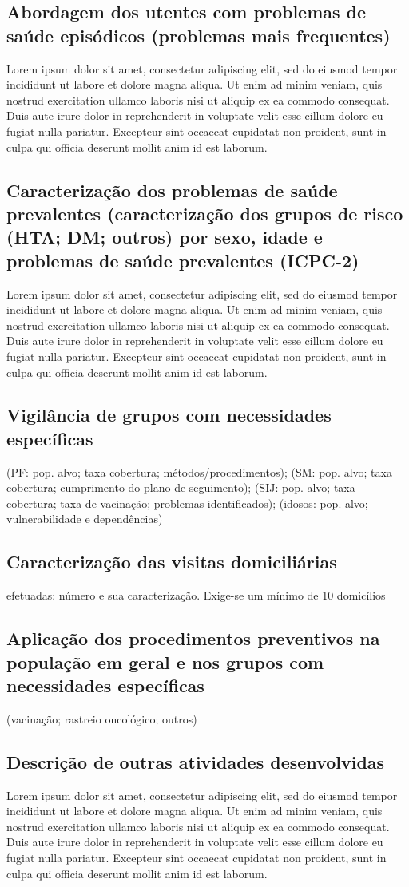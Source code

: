 \documentclass{report}
\begin{document}
\subsection{Abordagem dos utentes com problemas de saúde episódicos (problemas mais frequentes)}
Lorem ipsum dolor sit amet, consectetur adipiscing elit, sed do eiusmod tempor incididunt ut labore et dolore magna aliqua. Ut enim ad minim veniam, quis nostrud exercitation ullamco laboris nisi ut aliquip ex ea commodo consequat. Duis aute irure dolor in reprehenderit in voluptate velit esse cillum dolore eu fugiat nulla pariatur. Excepteur sint occaecat cupidatat non proident, sunt in culpa qui officia deserunt mollit anim id est laborum.
\subsection{Caracterização dos problemas de saúde prevalentes (caracterização dos grupos de risco (HTA; DM; outros) por sexo, idade e problemas de saúde prevalentes (ICPC-2)}
Lorem ipsum dolor sit amet, consectetur adipiscing elit, sed do eiusmod tempor incididunt ut labore et dolore magna aliqua. Ut enim ad minim veniam, quis nostrud exercitation ullamco laboris nisi ut aliquip ex ea commodo consequat. Duis aute irure dolor in reprehenderit in voluptate velit esse cillum dolore eu fugiat nulla pariatur. Excepteur sint occaecat cupidatat non proident, sunt in culpa qui officia deserunt mollit anim id est laborum.
\subsection{Vigilância de grupos com necessidades específicas}
(PF: pop. alvo; taxa cobertura; métodos/procedimentos); (SM: pop. alvo; taxa cobertura; cumprimento do plano de seguimento); (SIJ: pop. alvo; taxa cobertura; taxa de vacinação; problemas identificados); (idosos: pop. alvo; vulnerabilidade e dependências)
\subsection{Caracterização das visitas domiciliárias}
efetuadas: número e sua caracterização. Exige-se um mínimo de 10 domicílios
\subsection{Aplicação dos procedimentos preventivos na população em geral e nos grupos com necessidades específicas}
(vacinação; rastreio oncológico; outros)
\subsection{Descrição de outras atividades desenvolvidas}
Lorem ipsum dolor sit amet, consectetur adipiscing elit, sed do eiusmod tempor incididunt ut labore et dolore magna aliqua. Ut enim ad minim veniam, quis nostrud exercitation ullamco laboris nisi ut aliquip ex ea commodo consequat. Duis aute irure dolor in reprehenderit in voluptate velit esse cillum dolore eu fugiat nulla pariatur. Excepteur sint occaecat cupidatat non proident, sunt in culpa qui officia deserunt mollit anim id est laborum.
\end{document}
